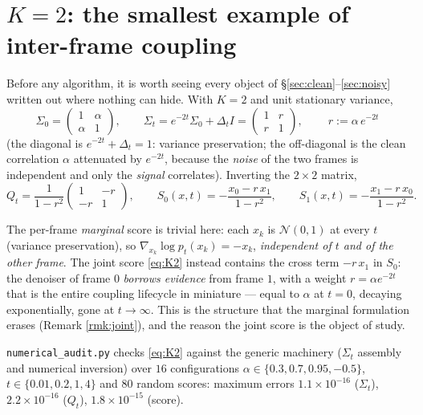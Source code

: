 \documentclass[11pt]{article}
\theoremstyle{definition}
\newcommand{\N}{\mathcal{N}}
\newcommand{\Sig}{\Sigma}
\newcommand{\Dt}{\Delta_t}
\newcommand{\Qt}{Q_t}
\begin{document}
\section{$K=2$: the smallest example of inter-frame coupling}\label{sec:K2}

Before any algorithm, it is worth seeing every object of
\S\ref{sec:clean}--\ref{sec:noisy} written out where nothing can hide. With
$K=2$ and unit stationary variance,
\[
  \Sig_0=\begin{pmatrix}1&\alpha\\ \alpha&1\end{pmatrix},\qquad
  \Sig_t=e^{-2t}\Sig_0+\Dt I
  =\begin{pmatrix}1& r\\ r&1\end{pmatrix},\qquad
  \boxed{\ r:=\alpha\,e^{-2t}\ }
\]
(the diagonal is $e^{-2t}+\Dt=1$: variance preservation; the off-diagonal is
the clean correlation $\alpha$ attenuated by $e^{-2t}$, because the
\emph{noise} of the two frames is independent and only the \emph{signal}
correlates). Inverting the $2\times2$ matrix,
\begin{equation}\label{eq:K2}
  \Qt=\frac{1}{1-r^2}\begin{pmatrix}1&-r\\-r&1\end{pmatrix},
  \qquad
  S_0(x,t)=-\frac{x_0-r\,x_1}{1-r^2},\qquad
  S_1(x,t)=-\frac{x_1-r\,x_0}{1-r^2}.
\end{equation}

\begin{intuition}
The per-frame \emph{marginal} score is trivial here: each $x_k$ is $\N(0,1)$
at every $t$ (variance preservation), so $\nabla_{x_k}\log p_t(x_k)=-x_k$,
\emph{independent of $t$ and of the other frame}. The joint score
\eqref{eq:K2} instead contains the cross term $-r\,x_1$ in $S_0$: the denoiser
of frame $0$ \emph{borrows evidence} from frame $1$, with a weight
$r=\alpha e^{-2t}$ that is the entire coupling lifecycle in miniature ---
equal to $\alpha$ at $t=0$, decaying exponentially, gone at $t\to\infty$. This
is the structure that the marginal formulation erases (Remark
\ref{rmk:joint}), and the reason the joint score is the object of study.
\end{intuition}

\begin{auditbox}[: $K=2$ closed forms]
\texttt{numerical\_audit.py} checks \eqref{eq:K2} against the generic
machinery ($\Sig_t$ assembly and numerical inversion) over $16$
configurations $\alpha\in\{0.3,0.7,0.95,-0.5\}$, $t\in\{0.01,0.2,1,4\}$ and
$80$ random scores: maximum errors $1.1\times10^{-16}$ ($\Sig_t$),
$2.2\times10^{-16}$ ($\Qt$), $1.8\times10^{-15}$ (score).
\end{auditbox}
\end{document}
